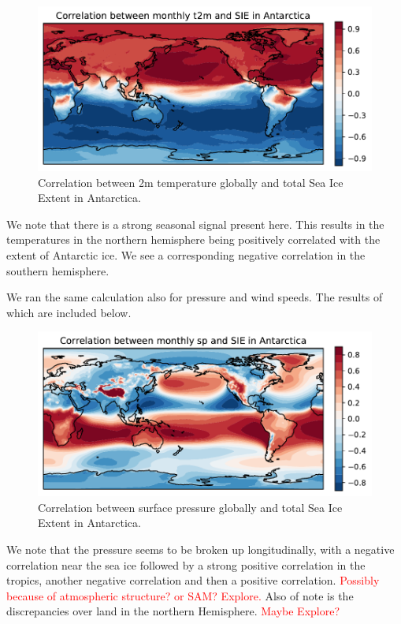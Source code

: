 \begin{figure}[H]
    \centering
    \includegraphics[width=\textwidth]{Images/global_correlation_monthly_t2m_sie.pdf}
    \caption{Correlation between 2m temperature globally and total Sea Ice Extent in Antarctica.}
    \label{fig:temp_sie_corr}
\end{figure}

We note that there is a strong seasonal signal present here. This results in the temperatures in the northern hemisphere being positively correlated with the extent of Antarctic ice. We see a corresponding negative correlation in the southern hemisphere.

We ran the same calculation also for pressure and wind speeds. The results of which are included below.
\begin{figure}[H]
    \centering
    \includegraphics[width=\textwidth]{Images/global_correlation_monthly_sp_sie.pdf}
    \caption{Correlation between surface pressure globally and total Sea Ice Extent in Antarctica.}
    \label{fig:sp_sie_corr}
\end{figure}
We note that the pressure seems to be broken up longitudinally, with a negative correlation near the sea ice followed by a strong positive correlation in the tropics, another negative correlation and then a positive correlation. \textcolor{red}{Possibly because of atmospheric structure? or SAM? Explore.} Also of note is the discrepancies over land in the northern Hemisphere. \textcolor{red}{Maybe Explore?}


